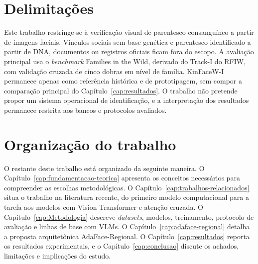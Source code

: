 \section{Delimitações}

Este trabalho restringe-se à verificação visual de parentesco consanguíneo a partir de imagens faciais. Vínculos sociais sem base genética e parentesco identificado a partir de DNA, documentos ou registros oficiais ficam fora do escopo. A avaliação principal usa o \textit{benchmark} Families in the Wild, derivado do Track-I do RFIW, com validação cruzada de cinco dobras em nível de família. KinFaceW-I permanece apenas como referência histórica e de prototipagem, sem compor a comparação principal do Capítulo~\ref{cap:resultados}. O trabalho não pretende propor um sistema operacional de identificação, e a interpretação dos resultados permanece restrita aos bancos e protocolos avaliados.

\section{Organização do trabalho}

O restante deste trabalho está organizado da seguinte maneira. O Capítulo~\ref{cap:fundamentacao-teorica} apresenta os conceitos necessários para compreender as escolhas metodológicas. O Capítulo~\ref{cap:trabalhos-relacionados} situa o trabalho na literatura recente, do primeiro modelo computacional para a tarefa aos modelos com Vision Transformer e atenção cruzada. O Capítulo~\ref{cap:Metodologia} descreve \textit{datasets}, modelos, treinamento, protocolo de avaliação e linhas de base com VLMs. O Capítulo~\ref{cap:adaface-regional} detalha a proposta arquitetônica AdaFace-Regional. O Capítulo~\ref{cap:resultados} reporta os resultados experimentais, e o Capítulo~\ref{cap:conclusao} discute os achados, limitações e implicações do estudo.
